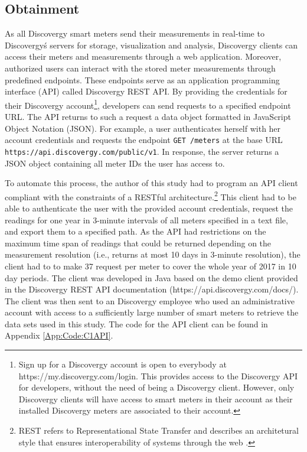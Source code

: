 
\subsection{Obtainment}\label{Sec:Data;Subsec:Obtainment}

As all Discovergy smart meters send their measurements in real-time to Discovergy\'s servers for storage, visualization and analysis, Discovergy clients can access their meters and measurements through a web application. Moreover, authorized users can interact with the stored meter measurements through predefined endpoints. These endpoints serve as an application programming interface (API) called Discovergy REST API. By providing the credentials for their Discovergy account\footnote{Sign up for a Discovergy account is open to everybody at https://my.discovergy.com/login. This provides access to the Discovergy API for developers, without the need of being a Discovergy client. However, only Discovergy clients will have access to smart meters in their account as their installed Discovergy meters are associated to their account.}, developers can send requests to a specified endpoint URL. The API returns to such a request a data object formatted in JavaScript Object Notation (JSON). For example, a user authenticates herself with her account credentials and requests the endpoint \texttt{GET /meters} at the base URL \texttt{https://api.discovergy.com/public/v1}. In response, the server returns a JSON object containing all meter IDs the user has access to.

To automate this process, the author of this study had to program an API client compliant with the constraints of a RESTful architecture.\footnote{REST refers to Representational State Transfer and describes an architetural style that ensures interoperability of systems through the web \citep[see][]{fielding:2000}.} This client  had to be able to authenticate the user with the provided account credentials, request the readings for one year in 3-minute intervals of all meters specified in a text file, and export them to a specified path. As the API had restrictions on the maximum time span of readings that could be returned depending on the measurement resolution (i.e., returns at most 10 days in 3-minute resolution), the client had to to make 37 request per meter to cover the whole year of 2017 in 10 day periods. The client was developed in Java based on the demo client provided in the Discovergy REST API documentation (https://api.discovergy.com/docs/). The client was then sent to an Discovergy employee who used an administrative account with access to a sufficiently large number of smart meters to retrieve the data sets used in this study. The code for the API client can be found in Appendix \ref{App:Code:C1API}.

